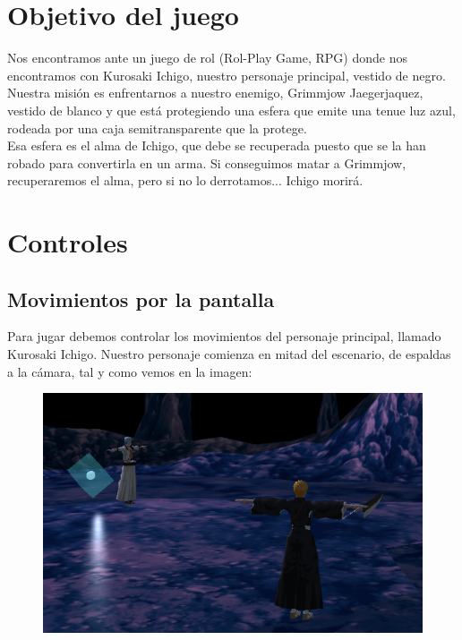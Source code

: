 \documentclass[11pt,a4paper]{article}
\begin{document}
\newpage

\section{Objetivo del juego}

Nos encontramos ante un juego de rol (Rol-Play Game, RPG) donde nos encontramos con Kurosaki Ichigo, nuestro personaje principal, vestido de negro.\\

Nuestra misión es enfrentarnos a nuestro enemigo, Grimmjow Jaegerjaquez, vestido de blanco y que está protegiendo una esfera que emite una tenue luz azul, rodeada por una caja semitransparente que la protege.\\

Esa esfera es el alma de Ichigo, que debe se recuperada puesto que se la han robado para convertirla en un arma. Si conseguimos matar a Grimmjow, recuperaremos el alma, pero si no lo derrotamos... Ichigo morirá.

\section{Controles}

\subsection{Movimientos por la pantalla}

Para jugar debemos controlar los movimientos del personaje principal, llamado Kurosaki Ichigo. Nuestro personaje comienza en mitad del escenario, de espaldas a la cámara, tal y como vemos en la imagen:

\begin{figure}[H]
	\centering
	\includegraphics[scale=0.5]{img/inicio.png}
\end{figure}
\end{document}
